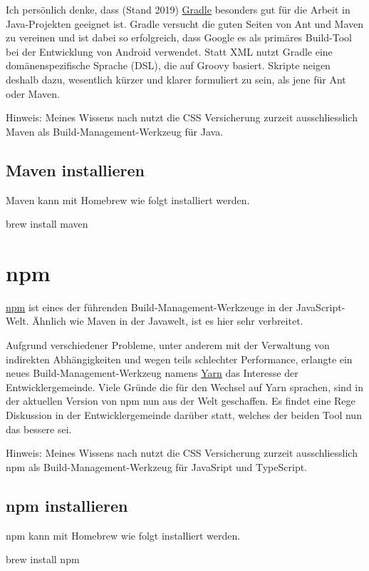 \documentclass[]{article}
\begin{document}
Ich persönlich denke, dass (Stand 2019) \href{https://gradle.org/}{Gradle} besonders gut für die Arbeit in Java-Projekten geeignet ist. Gradle versucht die guten Seiten von Ant und Maven zu vereinen und ist dabei so erfolgreich, dass Google es als primäres Build-Tool bei der Entwicklung von Android verwendet. Statt XML nutzt Gradle eine domänenspezifische Sprache (DSL), die auf Groovy basiert. Skripte neigen deshalb dazu, wesentlich kürzer und klarer formuliert zu sein, als jene für Ant oder Maven.

Hinweis: Meines Wissens nach nutzt die CSS Versicherung zurzeit ausschliesslich Maven als Build-Management-Werkzeug für Java.

\subsection{Maven installieren}
Maven kann mit Homebrew wie folgt installiert werden.
\begin{bashcode}
brew install maven
\end{bashcode}



\section{npm}
\href{https://www.npmjs.com/}{npm} ist eines der führenden Build-Management-Werkzeuge in der JavaScript-Welt. Ähnlich wie Maven in der Javawelt, ist es hier sehr verbreitet. 

Aufgrund verschiedener Probleme, unter anderem mit der Verwaltung von indirekten Abhängigkeiten und wegen teils schlechter Performance, erlangte ein neues Build-Management-Werkzeug namens \href{https://yarnpkg.com}{Yarn} das Interesse der Entwicklergemeinde. Viele Gründe die für den Wechsel auf Yarn sprachen, sind in der aktuellen Version von npm nun aus der Welt geschaffen. Es findet eine Rege Diskussion in der Entwicklergemeinde darüber statt, welches der beiden Tool nun das bessere sei.

Hinweis: Meines Wissens nach nutzt die CSS Versicherung zurzeit ausschliesslich npm als Build-Management-Werkzeug für JavaSript und TypeScript.

\subsection{npm installieren}
npm kann mit Homebrew wie folgt installiert werden.
\begin{bashcode}
brew install npm
\end{bashcode}
\end{document}

